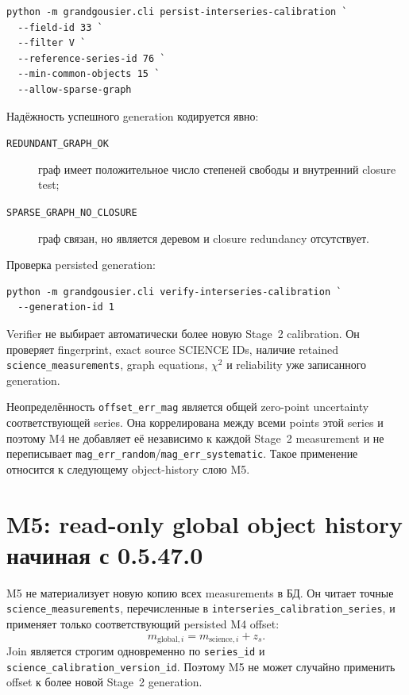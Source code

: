 \begin{lstlisting}
python -m grandgousier.cli persist-interseries-calibration `
  --field-id 33 `
  --filter V `
  --reference-series-id 76 `
  --min-common-objects 15 `
  --allow-sparse-graph
\end{lstlisting}

Надёжность успешного generation кодируется явно:

\begin{description}
  \item[\texttt{REDUNDANT\_GRAPH\_OK}] граф имеет положительное число степеней свободы и внутренний closure test;
  \item[\texttt{SPARSE\_GRAPH\_NO\_CLOSURE}] граф связан, но является деревом и closure redundancy отсутствует.
\end{description}

Проверка persisted generation:

\begin{lstlisting}
python -m grandgousier.cli verify-interseries-calibration `
  --generation-id 1
\end{lstlisting}

Verifier не выбирает автоматически более новую Stage~2 calibration. Он проверяет fingerprint, exact source SCIENCE IDs, наличие retained \texttt{science\_measurements}, graph equations, $\chi^2$ и reliability уже записанного generation.

Неопределённость \texttt{offset\_err\_mag} является общей zero-point uncertainty соответствующей series. Она коррелирована между всеми points этой series и поэтому M4 не добавляет её независимо к каждой Stage~2 measurement и не переписывает \texttt{mag\_err\_random}/\texttt{mag\_err\_systematic}. Такое применение относится к следующему object-history слою M5.

\section{M5: read-only global object history начиная с 0.5.47.0}

M5 не материализует новую копию всех measurements в БД. Он читает точные \texttt{science\_measurements}, перечисленные в \texttt{interseries\_calibration\_series}, и применяет только соответствующий persisted M4 offset:
\[
  m_{\mathrm{global},i}=m_{\mathrm{science},i}+z_s.
\]
Join является строгим одновременно по \texttt{series\_id} и \texttt{science\_calibration\_version\_id}. Поэтому M5 не может случайно применить offset к более новой Stage~2 generation.

